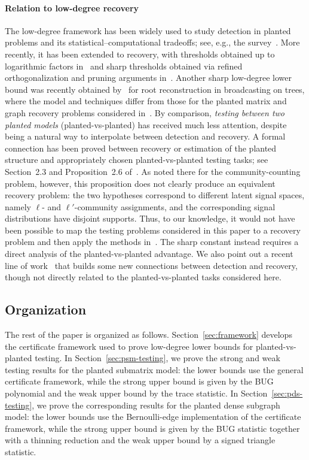 \documentclass[11pt, letterpaper]{article}
\numberwithin{equation}{section}
\begin{document}
\paragraph*{Relation to low-degree recovery}
The low-degree framework has been widely used to study detection in planted problems and its statistical--computational tradeoffs; see, e.g., the survey~\cite{wein2025computational}. More recently, it has been extended to recovery, with thresholds obtained up to logarithmic factors in~\cite{schramm2022computational} and sharp thresholds obtained via refined orthogonalization and pruning arguments in~\cite{sohn2025sharp}. Another sharp low-degree lower bound was recently obtained by~\cite{optimal-bot} for root reconstruction in broadcasting on trees,
where the model and techniques differ from those for the planted matrix and graph
recovery problems considered in~\cite{sohn2025sharp}.
By comparison, \emph{testing between two planted models} (planted-vs-planted) has received much less
attention, despite being a natural way to interpolate between detection and recovery.
 A formal connection has been proved between recovery or estimation of the planted structure and appropriately chosen planted-vs-planted testing tasks; see Section~2.3 and Proposition~2.6 of~\cite{rush2023easier}. As noted there for the community-counting problem, however, this proposition does not clearly produce an equivalent recovery problem: the two hypotheses correspond to different latent signal spaces, namely $\ell$- and $\ell'$-community assignments, and the corresponding signal distributions have disjoint supports. Thus, to our knowledge, it would not have been possible to map the testing problems considered in this paper to a recovery problem and then apply the methods in~\cite{sohn2025sharp}. The sharp constant instead requires a direct analysis of the planted-vs-planted advantage. We also point out a recent line of work~\cite{alg-contig,DHSS-recovery,alg-contig-2} that builds some new connections between detection and recovery, though not directly related to the planted-vs-planted tasks considered here.  

 \subsection{Organization}
The rest of the paper is organized as follows. Section~\ref{sec:framework} develops the certificate framework used to prove low-degree lower bounds for planted-vs-planted testing. In Section~\ref{sec:psm-testing}, we prove the strong and weak testing results for the planted submatrix model: the lower bounds use the general certificate framework, while the strong upper bound is given by the BUG polynomial and the weak upper bound by the trace statistic. In Section~\ref{sec:pds-testing}, we prove the corresponding results for the planted dense subgraph model: the lower bounds use the Bernoulli-edge implementation of the certificate framework, while the strong upper bound is given by the BUG statistic together with a thinning reduction and the weak upper bound by a signed triangle statistic.
\end{document}
